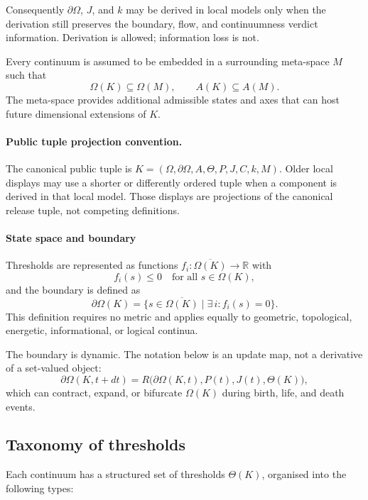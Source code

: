 Consequently \(\partial\Omega\), \(J\), and \(k\) may be derived in local
models only when the derivation still preserves the boundary, flow, and
continuumness verdict information. Derivation is allowed; information loss is
not.

Every continuum is assumed to be embedded in a surrounding meta-space \(M\) such that
\[
    \Omega(K)\subseteq\Omega(M), \qquad A(K)\subseteq A(M).
\]
The meta-space provides additional admissible states and axes that can host future dimensional extensions of \(K\).

\paragraph{Public tuple projection convention.}
The canonical public tuple is \(K=(\Omega,\partial\Omega,A,\Theta,P,J,C,k,M)\). Older local displays may use a shorter or differently ordered tuple when a component is derived in that local model. Those displays are projections of the canonical release tuple, not competing definitions.

\paragraph{State space and boundary}
Thresholds are represented as functions \(f_i : \overline{\Omega(K)} \to \mathbb{R}\) with
\[
    f_i(s) \le 0 \quad\text{for all } s \in \Omega(K),
\]
and the boundary is defined as
\[
    \partial\Omega(K) = \{ s \in \overline{\Omega(K)} \mid \exists\, i: f_i(s) = 0 \}.
\]
This definition requires no metric and applies equally to geometric, topological, energetic, informational, or logical continua.

The boundary is dynamic. The notation below is an update map, not a derivative
of a set-valued object:
\[
    \partial\Omega(K,t+dt) =
    R\big(\partial\Omega(K,t),P(t),J(t),\Theta(K)\big),
\]
which can contract, expand, or bifurcate \(\Omega(K)\) during birth, life, and death events.

\subsection{Taxonomy of thresholds}

Each continuum has a structured set of thresholds \(\Theta(K)\), organised into the following types:

